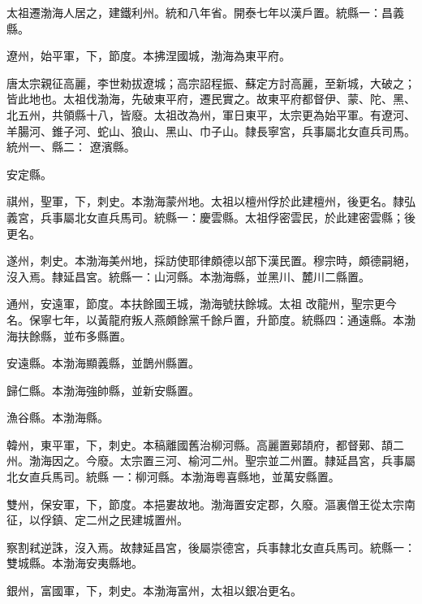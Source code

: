 \begin{pinyinscope}
 太祖遷渤海人居之，建鐵利州。統和八年省。開泰七年以漢戶置。統縣一：昌義縣。



 遼州，始平軍，下，節度。本拂涅國城，渤海為東平府。



 唐太宗親征高麗，李世勑拔遼城；高宗詔程振、蘇定方討高麗，至新城，大破之；皆此地也。太祖伐渤海，先破東平府，遷民實之。故東平府都督伊、蒙、陀、黑、北五州，共領縣十八，皆廢。太祖改為州，軍日東平，太宗更為始平軍。有遼河、羊腸河、錐子河、蛇山、狼山、黑山、巾子山。隸長寧宮，兵事屬北女直兵司馬。統州一、縣二：
 遼濱縣。



 安定縣。



 祺州，聖軍，下，刺史。本渤海蒙州地。太祖以檀州俘於此建檀州，後更名。隸弘義宮，兵事屬北女直兵馬司。統縣一：慶雲縣。太祖俘密雲民，於此建密雲縣；後更名。



 遂州，刺史。本渤海美州地，採訪使耶律頗德以部下漢民置。穆宗時，頗德嗣絕，沒入焉。隸延昌宮。統縣一：山河縣。本渤海縣，並黑川、麓川二縣置。



 通州，安遠軍，節度。本扶餘國王城，渤海號扶餘城。太祖
 改龍州，聖宗更今名。保寧七年，以黃龍府叛人燕頗餘黨千餘戶置，升節度。統縣四：通遠縣。本渤海扶餘縣，並布多縣置。



 安遠縣。本渤海顯義縣，並鵲州縣置。



 歸仁縣。本渤海強帥縣，並新安縣置。



 漁谷縣。本渤海縣。



 韓州，東平軍，下，刺史。本稿離國舊治柳河縣。高麗置鄚頡府，都督鄚、頡二州。渤海因之。今廢。太宗置三河、榆河二州。聖宗並二州置。隸延昌宮，兵事屬北女直兵馬司。統縣
 一：柳河縣。本渤海粵喜縣地，並萬安縣置。



 雙州，保安軍，下，節度。本挹婁故地。渤海置安定郡，久廢。漚裏僧王從太宗南征，以俘鎮、定二州之民建城置州。



 察割弒逆誅，沒入焉。故隸延昌宮，後屬崇德宮，兵事隸北女直兵馬司。統縣一：雙城縣。本渤海安夷縣地。



 銀州，富國軍，下，刺史。本渤海富州，太祖以銀冶更名。




\end{pinyinscope}
